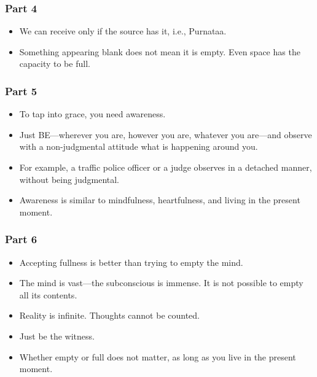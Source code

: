 \begin{frame}[fragile]\frametitle{Part 4}

\begin{itemize}
    \item We can receive only if the source has it, i.e., Purnataa.
    \item Something appearing blank does not mean it is empty. Even space has the capacity to be full.
\end{itemize}

\end{frame}

\begin{frame}[fragile]\frametitle{Part 5}

\begin{itemize}
    \item To tap into grace, you need awareness.
    \item Just BE—wherever you are, however you are, whatever you are—and observe with a non-judgmental attitude what is happening around you.
    \item For example, a traffic police officer or a judge observes in a detached manner, without being judgmental.
    \item Awareness is similar to mindfulness, heartfulness, and living in the present moment.
\end{itemize}

\end{frame}

\begin{frame}[fragile]\frametitle{Part 6}

\begin{itemize}
    \item Accepting fullness is better than trying to empty the mind.
    \item The mind is vast—the subconscious is immense. It is not possible to empty all its contents.
    \item Reality is infinite. Thoughts cannot be counted.
    \item Just be the witness.
    \item Whether empty or full does not matter, as long as you live in the present moment.
\end{itemize}

\end{frame}

